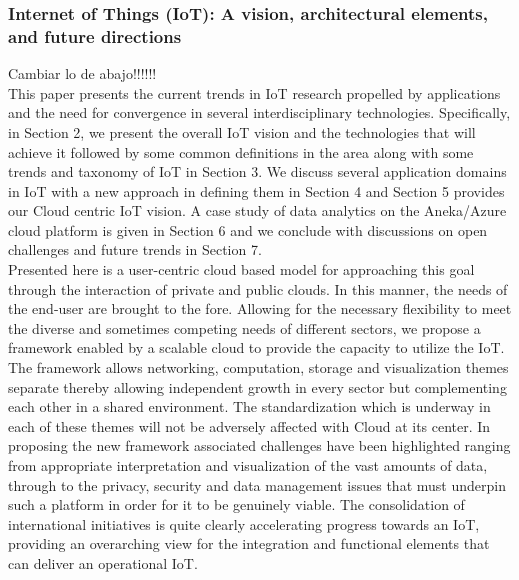\subsubsection{Internet of Things (IoT): A vision, architectural elements, and future directions}\cite{Paper9}
Cambiar lo de abajo!!!!!!\\
This paper presents the current trends in IoT research propelled by applications and the need for convergence in several interdisciplinary technologies. Specifically, in Section 2, we present the overall IoT vision and the technologies that will achieve it followed by some common definitions in the area along with some trends and taxonomy of IoT in Section 3. We discuss several application domains in IoT with a new approach in defining them in Section 4 and Section 5 provides our Cloud centric IoT vision. A case study of data analytics on the Aneka/Azure cloud platform is given in Section 6 and we conclude with discussions on open challenges and future trends in Section 7.\\
Presented here is a user-centric cloud based model for approaching this goal through the interaction of private and public clouds. In this manner, the needs of the end-user are brought to the fore. Allowing for the necessary flexibility to meet the diverse and sometimes competing needs of different sectors, we propose a framework enabled by a scalable cloud to provide the capacity to utilize the IoT. The framework allows networking, computation, storage and visualization themes separate thereby allowing independent growth in every sector but complementing each other in a shared environment. The standardization which is underway in each of these themes will not be adversely affected with Cloud at its center. In proposing the new framework associated challenges have been highlighted ranging from appropriate interpretation and visualization of the vast amounts of data, through to the privacy, security and data management issues that must underpin such a platform in order for it to be genuinely viable. The consolidation of international initiatives is quite clearly accelerating progress towards an IoT, providing an overarching view for the integration and functional elements that can deliver an operational IoT.

